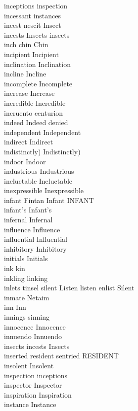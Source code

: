 inceptions inspection\\
incessant instances\\
incest nescit Insect\\
incests Insects insects\\
inch chin Chin\\
incipient Incipient\\
inclination Inclination\\
incline Incline\\
incomplete Incomplete\\
increase Increase\\
incredible Incredible\\
incruento centurion\\
indeed Indeed denied\\
independent Independent\\
indirect Indirect\\
indistinctly) Indistinctly)\\
indoor Indoor\\
industrious Industrious\\
ineluctable Ineluctable\\
inexpressible Inexpressible\\
infant Fintan Infant INFANT\\
infant's Infant's\\
infernal Infernal\\
influence Influence\\
influential Influential\\
inhibitory Inhibitory\\
initials Initials\\
ink kin\\
inkling linking\\
inlets tinsel silent Listen listen enlist Silent\\
inmate Netaim\\
inn Inn\\
innings sinning\\
innocence Innocence\\
innuendo Innuendo\\
insects incests Insects\\
inserted resident sentried RESIDENT\\
insolent Insolent\\
inspection inceptions\\
inspector Inspector\\
inspiration Inspiration\\
instance Instance\\
